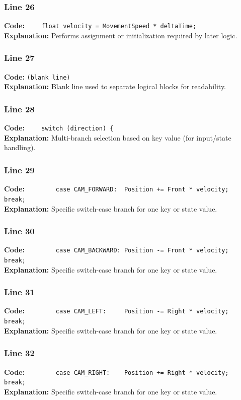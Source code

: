 \documentclass[11pt,a4paper]{article}
\begin{document}
\subsubsection*{Line 26}
\textbf{Code:} \verb|    float velocity = MovementSpeed * deltaTime;|\\
\textbf{Explanation:} Performs assignment or initialization required by later logic.

\subsubsection*{Line 27}
\textbf{Code:} \texttt{(blank line)}\\
\textbf{Explanation:} Blank line used to separate logical blocks for readability.

\subsubsection*{Line 28}
\textbf{Code:} \verb|    switch (direction) {|\\
\textbf{Explanation:} Multi-branch selection based on key value (for input/state handling).

\subsubsection*{Line 29}
\textbf{Code:} \verb|        case CAM_FORWARD:  Position += Front * velocity;   break;|\\
\textbf{Explanation:} Specific switch-case branch for one key or state value.

\subsubsection*{Line 30}
\textbf{Code:} \verb|        case CAM_BACKWARD: Position -= Front * velocity;   break;|\\
\textbf{Explanation:} Specific switch-case branch for one key or state value.

\subsubsection*{Line 31}
\textbf{Code:} \verb|        case CAM_LEFT:     Position -= Right * velocity;   break;|\\
\textbf{Explanation:} Specific switch-case branch for one key or state value.

\subsubsection*{Line 32}
\textbf{Code:} \verb|        case CAM_RIGHT:    Position += Right * velocity;   break;|\\
\textbf{Explanation:} Specific switch-case branch for one key or state value.
\end{document}
